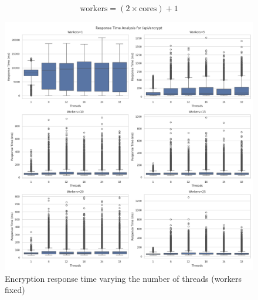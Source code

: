 \documentclass[cic,tc,english]{iiufrgs}
\begin{document}
        \begin{equation}
            \label{form:numberworkers}
            \text{workers} = (2 \times \text{cores}) + 1
        \end{equation}

        \begin{figure}
            \centering
            \includegraphics[width=\textwidth]{images/phase1/api_encrypt/response_time_workers_summary.png}
            \caption{Encryption response time varying the number of threads (workers fixed)}
            \label{fig:encrypt_response_time_workers}
        \end{figure}
\end{document}
